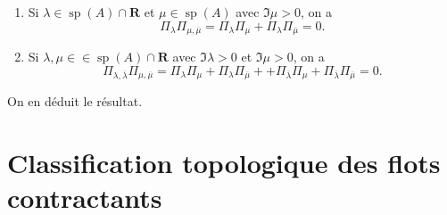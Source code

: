 \documentclass[french, 12pt]{article}
\theoremstyle{definition}
\newcommand{\ol}[1]{\overline{#1}}
\newcommand{\Rbb}{\mathbf{R}}
\newcommand{\spec}{\operatorname{sp}}
\begin{document}
\begin{enumerate}
\begin{enumerate}
        \item  Si $\lambda \in \spec(A) \cap \Rbb$ et $\mu \in \spec(A)$ avec $\Im \mu > 0$, on a
            $$\Pi_\lambda \Pi_{\mu,\ol{\mu}} = \Pi_\lambda \Pi_\mu + \Pi_\lambda \Pi_{\ol{\mu}} = 0.$$
            
        \item Si $\lambda,\mu \in \in \spec(A) \cap \Rbb$ avec $\Im \lambda > 0$ et $\Im \mu > 0$, on a
            $$\Pi_{\lambda,\ol{\lambda}} \Pi_{\mu,\ol{\mu}} = \Pi_\lambda \Pi_\mu + \Pi_\lambda \Pi_{\ol{\mu}} + + \Pi_{\ol{\lambda}}\Pi_\mu +  \Pi_{\ol{\lambda}} \Pi_{\ol{\mu}} = 0.$$
    \end{enumerate}
    On en d\'eduit le r\'esultat.
\end{enumerate}



\section*{Classification topologique des flots contractants}
\end{document}
